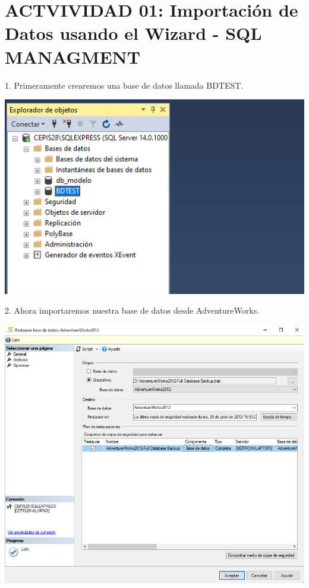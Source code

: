 \section{ACTVIVIDAD 01: Importación de Datos usando el Wizard - SQL MANAGMENT} 

1. Primeramente crearemos una base de datos llamada BDTEST.
	\begin{center}
	\includegraphics[width=\columnwidth]{images/task1/img1}
	\end{center}	


2. Ahora importaremos nuestra base de datos desde AdventureWorks.
	\begin{center}
	\includegraphics[width=\columnwidth]{images/task1/img2}
	\end{center}	

